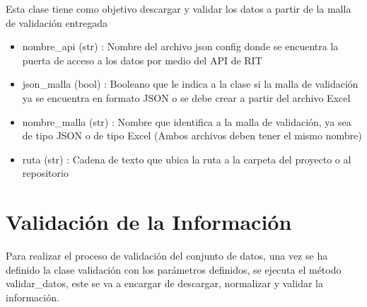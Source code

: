 \documentclass[letterpaper,10pt,spanish]{sphinxmanual}
\begin{document}
\begin{fulllineitems}
\label{\detokenize{index:MallaValidacionRuta.validacion}}
\pysigstartsignatures
{}
\pysigstopsignatures
\sphinxAtStartPar
Esta clase tiene como objetivo descargar y validar los datos a partir de la malla de validación entregada
\begin{description}
\begin{itemize}
\item {} 
\sphinxAtStartPar
nombre\_api (str) : Nombre del archivo json config donde se encuentra la puerta de acceso a los datos por medio del API de RIT

\item {} 
\sphinxAtStartPar
json\_malla (bool) : Booleano que le indica a la clase si la malla de validación ya se encuentra en formato JSON o se debe crear a partir del archivo Excel

\item {} 
\sphinxAtStartPar
nombre\_malla (str) : Nombre que identifica a la malla de validación, ya sea de tipo JSON o de tipo Excel (Ambos archivos deben tener el mismo nombre)

\item {} 
\sphinxAtStartPar
ruta (str) : Cadena de texto que ubica la ruta a la carpeta del proyecto o al repositorio

\end{itemize}

\end{description}

\end{fulllineitems}



\chapter{Validación de la Información}
\label{\detokenize{index:validacion-de-la-informacion}}
\sphinxAtStartPar
Para realizar el proceso de validación del conjunto de datos, una vez se ha definido la clase validación con los parámetros definidos, se ejecuta el método validar\_datos, este se va a encargar de descargar, normalizar y validar la información.
\end{document}
